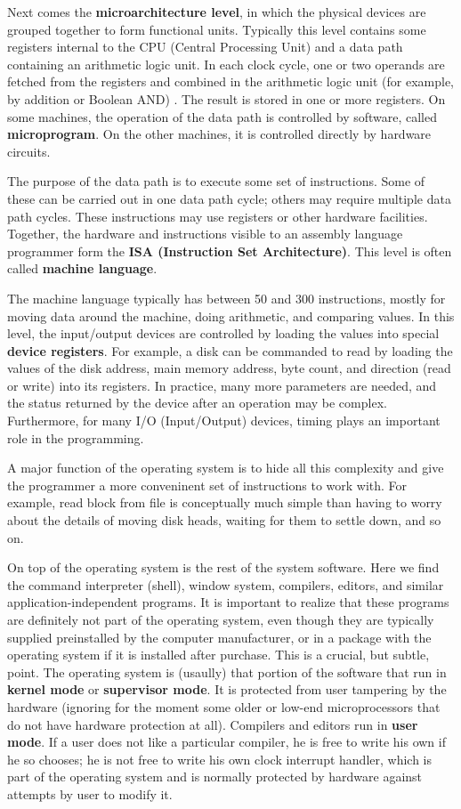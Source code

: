 \documentclass{book}
\newcommand {\kw} [1] {\textbf{#1}}
\begin{document}
Next comes the \kw{microarchitecture level}, in which the physical devices are grouped together to form functional units.
Typically this level contains some registers internal to the CPU (Central Processing Unit) and a data path containing an arithmetic logic unit.
In each clock cycle, one or two operands are fetched from the registers and combined in the arithmetic logic unit 
(for example, by addition or Boolean AND) .
The result is stored in one or more registers.
On some machines, the operation of the data path is controlled by software, called \kw{microprogram}.
On the other machines, it is controlled directly by hardware circuits.

The purpose of the data path is to execute some set of instructions.
Some of these can be carried out in one data path cycle; others may require multiple data path cycles.
These instructions may use registers or other hardware facilities.
Together, the hardware and instructions visible to an assembly language programmer form the \kw{ISA (Instruction Set Architecture)}.
This level is often called \kw{machine language}.

The machine language typically has between 50 and 300 instructions, mostly for moving data around the machine, doing arithmetic, and comparing values.
In this level, the input/output devices are controlled by loading the values into special \kw{device registers}.
For example, a disk can be commanded to read by loading the values of the disk address, main memory address, byte count, 
and direction (read or write) into its registers.
In practice, many more parameters are needed, and the status returned by the device after an operation may be complex.
Furthermore, for many I/O (Input/Output) devices, timing plays an important role in the programming.

A major function of the operating system is to hide all this complexity and give the programmer a more conveninent set of instructions to work with.
For example, read block from file is conceptually much simple than having to worry about the details of moving disk heads, 
waiting for them to settle down, and so on.

On top of the operating system is the rest of the system software.
Here we find the command interpreter (shell), window system, compilers, editors, and similar application-independent programs.
It is important to realize that these programs are definitely not part of the operating system, 
even though they are typically supplied preinstalled by the computer manufacturer, 
or in a package with the operating system if it is installed after purchase.
This is a crucial, but subtle, point.
The operating system is (usaully) that portion of the software that run in \kw{kernel mode} or \kw{supervisor mode}.
It is protected from user tampering by the hardware 
(ignoring for the moment some older or low-end microprocessors that do not have hardware protection at all).
Compilers and editors run in \kw{user mode}.
If a user does not like a particular compiler, he is free to write his own if he so chooses; 
he is not free to write his own clock interrupt handler, which is part of the operating system 
and is normally protected by hardware against attempts by user to modify it.
\end{document}
